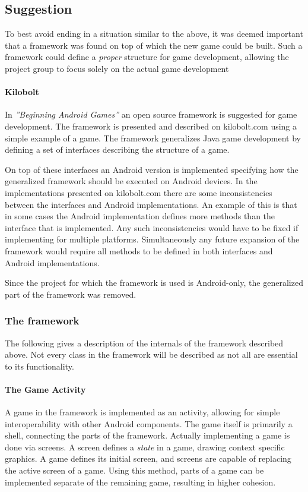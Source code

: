 \subsection{Suggestion}
To best avoid ending in a situation similar to the above, it was deemed important that a framework was found on top of which the new game could be built.
Such a framework could define a \textit{proper} structure for game development, allowing the project group to focus solely on the actual game development

\paragraph{Kilobolt}\label{kilobolt:description}
In \textit{''Beginning Android Games''}\cite{androidgames} an open source framework is suggested for game development.
The framework is presented and described on kilobolt.com\cite{kilobolt} using a simple example of a game.
The framework generalizes Java game development by defining a set of interfaces describing the structure of a game.

On top of these interfaces an Android version is implemented specifying how the generalized framework should be executed on Android devices.
In the implementations presented on kilobolt.com there are some inconsistencies between the interfaces and Android implementations.
An example of this is that in some cases the Android implementation defines more methods than the interface that is implemented.
Any such inconsistencies would have to be fixed if implementing for multiple platforms.
Simultaneously any future expansion of the framework would require all methods to be defined in both interfaces and Android implementations. 

Since the project for which the framework is used is Android-only, the generalized part of the framework was removed.

\subsubsection{The framework}
The following gives a description of the internals of the framework described above.
Not every class in the framework will be described as not all are essential to its functionality.

\paragraph{The Game Activity}
A game in the framework is implemented as an activity, allowing for simple interoperability with other Android components.
The game itself is primarily a shell, connecting the parts of the framework.
Actually implementing a game is done via screens.
A screen defines a \textit{state} in a game, drawing context specific graphics.
A game defines its initial screen, and screens are capable of replacing the active screen of a game.
Using this method, parts of a game can be implemented separate of the remaining game, resulting in higher cohesion.

